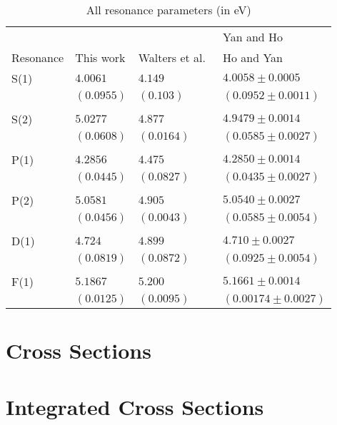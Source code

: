 \documentclass[Dissertation.tex]{subfiles}
\begin{document}
\setlength{\abovecaptionskip}{6pt}   %
\setlength{\belowcaptionskip}{6pt}   %
\begin{table}[H]
\centering
\begin{tabular}{l l l l}
\toprule
 & & & Yan and Ho \cite{Yan1999, Yan1998a} \\
Resonance & This work & Walters et al.\ \cite{Walters2004} & Ho and Yan \cite{Ho1998, Ho2000} \\
\midrule
S(1) & $4.0061$ & $4.149$ & $4.0058 \pm 0.0005$ \\
     & $(0.0955)$ & $(0.103)$ & $(0.0952 \pm 0.0011)$ \\
\\
S(2) & $5.0277$ & $4.877$ & $4.9479 \pm 0.0014$ \\
     & $(0.0608)$ & $(0.0164)$ & $(0.0585 \pm 0.0027)$ \\
\\
P(1) & $4.2856$ & $4.475$ & $4.2850 \pm 0.0014$ \\
     & $(0.0445)$ & $(0.0827)$ & $(0.0435 \pm 0.0027)$ \\
\\
P(2) & $5.0581$ & $4.905$ & $5.0540 \pm 0.0027$ \\
     & $(0.0456)$ & $(0.0043)$ & $(0.0585 \pm 0.0054)$ \\
\\
D(1) & $4.724$ & $4.899$ & $4.710 \pm 0.0027$ \\
     & $(0.0819)$ & $(0.0872)$ & $(0.0925 \pm 0.0054)$ \\
\\
F(1) & $5.1867$ & $5.200$ & $5.1661 \pm 0.0014$ \\
     & $(0.0125)$ & $(0.0095)$ & $(0.00174 \pm 0.0027)$ \\
\bottomrule
\end{tabular}
\caption{All resonance parameters (in eV)} %
\label{tab:AllResonanceComparisons}
\end{table}


\section{Cross Sections}
\label{sec:cross}

\section{Integrated Cross Sections}
\label{sec:totalcross}
\end{document}
